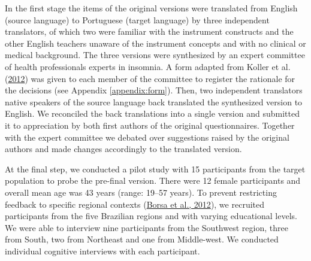 \documentclass[
  ,doc,11pt, twoside,floatsintext]{apa6}
\begin{document}
In the first stage the items of the original versions were translated from English (source language) to Portuguese (target language) by three independent translators, of which two were familiar with the instrument constructs and the other English teachers unaware of the instrument concepts and with no clinical or medical background. The three versions were synthesized by an expert committee of health professionals experts in insomnia. A form adapted from Koller et al. (\protect\hyperlink{ref-koller2012}{2012}) was given to each member of the committee to register the rationale for the decisions (see Appendix \ref{appendix:form}). Then, two independent translators native speakers of the source language back translated the synthesized version to English. We reconciled the back translations into a single version and submitted it to appreciation by both first authors of the original questionnaires. Together with the expert committee we debated over suggestions raised by the original authors and made changes accordingly to the translated version.

At the final step, we conducted a pilot study with 15 participants from the target population to probe the pre-final version. There were 12 female participants and overall mean age was 43 years (range: 19--57 years). To prevent restricting feedback to specific regional contexts (\protect\hyperlink{ref-borsaAdaptacaoValidacaoInstrumentos2012}{Borsa et al., 2012}), we recruited participants from the five Brazilian regions and with varying educational levels. We were able to interview nine participants from the Southwest region, three from South, two from Northeast and one from Middle-west. We conducted individual cognitive interviews with each participant.
\end{document}
